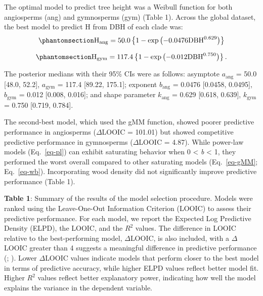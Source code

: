 \documentclass[
  12pt,
  letterpaper,
  DIV=11,
  numbers=noendperiod]{scrartcl}
\begin{document}
The optimal model to predict tree height was a Weibull function for both
angiosperms (ang) and gymnosperms (gym) (Table 1). Across the global
dataset, the best model to predict H from DBH of each clade was:
\begin{equation}\phantomsection\label{eq-h_ang}{
\mathrm{H_{ang}} =50.0
\left\{ 1 - \exp\left( - 0.0476
\mathrm{DBH}^{0.629}
\right) \right\}
}\end{equation}

\begin{equation}\phantomsection\label{eq-h_gym}{
\mathrm{H_{gym}} = 117.4
\left\{ 1 - \exp\left( - 0.012
\mathrm{DBH}^{0.750}
\right) \right\}.
}\end{equation}

The posterior medians with their 95\% CIs were as follows: asymptote
\(a_{\text{ang}}\) = 50.0 {[}48.0, 52.2{]}, \(a_{\text{gym}}\) = 117.4
{[}89.22, 175.1{]}; exponent \(b_{\text{ang}}\) = 0.0476 {[}0.0458,
0.0495{]}, \(b_{\text{gym}}\) = 0.012 {[}0.008, 0.016{]}; and shape
parameter \(k_{\text{ang}}\) = 0.629 {[}0.618, 0.639{]},
\(k_{\text{gym}}\) = 0.750 {[}0.719, 0.784{]}.

The second-best model, which used the gMM function, showed poorer
predictive performance in angiosperms (\(\Delta\)LOOIC = 101.01) but
showed competitive predictive performance in gymnosperms
(\(\Delta\)LOOIC = 4.87). While power-law models (Eq.~\ref{eq-pl}) can
exhibit saturating behavior when 0 \textless{} \emph{b} \textless{} 1,
they performed the worst overall compared to other saturating models
(Eq.~\ref{eq-gMM}; Eq.~\ref{eq-wb}). Incorporating wood density did not
significantly improve predictive performance (Table 1).

\textbf{Table 1}: Summary of the results of the model selection
procedure. Models were ranked using the Leave-One-Out Information
Criterion (LOOIC) to assess their predictive performance. For each
model, we report the Expected Log Predictive Density (ELPD), the LOOIC,
and the \(R^2\) values. The difference in LOOIC relative to the
best-performing model, \(\Delta\)LOOIC, is also included, with a
\(\Delta\)LOOIC greater than 4 suggests a meaningful difference in
predictive performance (; ). Lower
\(\Delta\)LOOIC values indicate models that perform closer to the best
model in terms of predictive accuracy, while higher ELPD values reflect
better model fit. Higher \(R^2\) values reflect better explanatory
power, indicating how well the model explains the variance in the
dependent variable.
\end{document}
